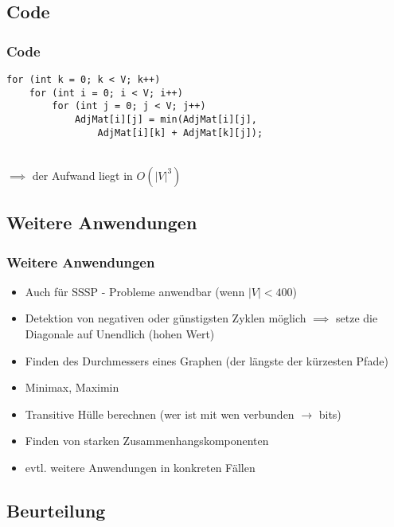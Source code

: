 
\subsection{Code}

\begin{frame}[fragile] %
\frametitle{Code}

\begin{lstlisting}
for (int k = 0; k < V; k++)
    for (int i = 0; i < V; i++)
        for (int j = 0; j < V; j++)
            AdjMat[i][j] = min(AdjMat[i][j],
                AdjMat[i][k] + AdjMat[k][j]);
\end{lstlisting}

~\\$\implies$ der Aufwand liegt in $O(|V|^3)$

\end{frame}


\subsection{Weitere Anwendungen} 

\begin{frame}
\frametitle{Weitere Anwendungen}
\begin{itemize}

\item Auch für SSSP - Probleme anwendbar (wenn $\vert V \vert < 400$)
\item Detektion von negativen oder günstigsten Zyklen möglich $\implies$ setze die Diagonale auf Unendlich (hohen Wert)
\item Finden des Durchmessers eines Graphen (der längste der kürzesten Pfade)
\item Minimax, Maximin
\item Transitive Hülle berechnen (wer ist mit wen verbunden $\rightarrow$ bits)
\item Finden von starken Zusammenhangskomponenten
\item evtl. weitere Anwendungen in konkreten Fällen
\end{itemize}
\end{frame}


\subsection{Beurteilung} 

